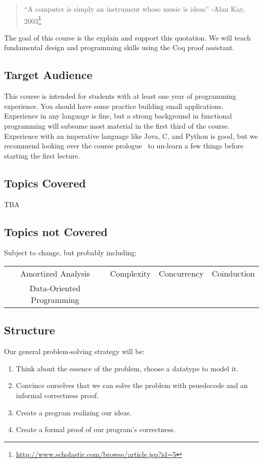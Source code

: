 \documentclass{article}
\begin{document}
\maketitle

\begin{quote}
  ``A computer is simply an instrument whose music is ideas'' -Alan Kay, 2003\footnote{\url{http://www.scholastic.com/browse/article.jsp?id=5}}
\end{quote}

The goal of this course is the explain and support this quotation.
We will teach fundamental design and programming skills using the Coq proof assistant.

\subsection*{Target Audience}
This course is intended for students with at least one year of programming experience.
You should have some practice building small applications.
Experience in any language is fine, but a strong background in functional programming will subsume most material in the first third of the course.
Experience with an imperative language like Java, C, and Python is good, but we recommend looking over the course prologue~\cite{TODO} to un-learn a few things before starting the first lecture.

\subsection*{Topics Covered}
TBA

\subsection*{Topics not Covered}
Subject to change, but probably including:

\begin{center}
  \begin{tabular}{c c c c}
    Amortized Analysis & Complexity & Concurrency & Coinduction
  \\Data-Oriented Programming & & &
  \end{tabular}
\end{center}

\subsection*{Structure}
Our general problem-solving strategy will be:
\begin{enumerate}
\item Think about the essence of the problem, choose a datatype to model it.
\item Convince ourselves that we can solve the problem with psuedocode and an informal correctness proof.
\item Create a program realizing our ideas.
\item Create a formal proof of our program's correctness.
\end{enumerate}
\end{document}
